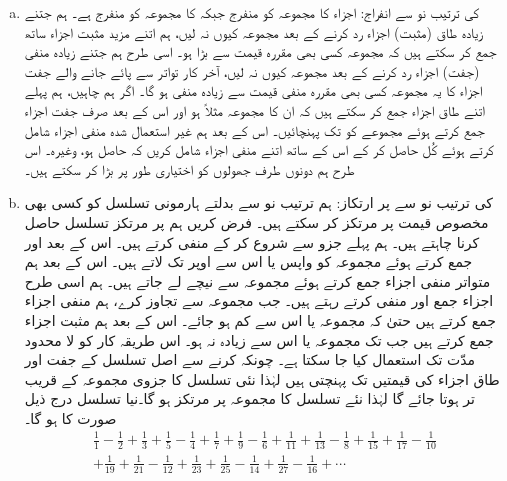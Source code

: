 \begin{enumerate}[a.]
\item
{} کی ترتیب نو سے انفراج: \quad
اجزاء  کا مجموعہ  کو منفرج جبکہ  کا مجموعہ  کو منفرج ہے۔ ہم جتنے زیادہ طاق (مثبت) اجزاء رد کرنے  کے بعد  مجموعہ کیوں نہ لیں، ہم اتنے  مزید مثبت اجزاء  ساتھ جمع کر سکتے ہیں کہ   مجموعہ کسی بھی مقررہ قیمت سے بڑا ہو۔ اسی طرح ہم  جتنے زیادہ منفی (جفت)  اجزاء  رد کرنے کے بعد  مجموعہ کیوں نہ لیں، آخر کار تواتر سے پائے جانے والے جفت اجزاء کا یہ مجموعہ کسی بھی مقررہ منفی قیمت سے زیادہ منفی ہو گا۔ اگر ہم چاہیں، ہم پہلے اتنے طاق اجزاء جمع کر سکتے ہیں کہ ان کا مجموعہ مثلاً  ہو اور اس کے بعد صرف جفت اجزاء جمع کرتے ہوئے مجموعے کو  تک پہنچائیں۔ اس کے بعد ہم غیر استعمال شدہ منفی اجزاء شامل کرتے ہوئے کُل حاصل کر کے اس کے ساتھ اتنے منفی اجزاء شامل کریں کہ  حاصل ہو، وغیرہ۔ اس طرح ہم دونوں طرف  جھولوں کو اختیاری  طور پر  بڑا کر سکتے ہیں۔ 
\item
{} کی ترتیب نو  سے  پر ارتکاز:\quad
ہم ترتیب نو سے   بدلتے ہارمونی تسلسل کو کسی بھی مخصوص قیمت پر مرتکز کر سکتے ہیں۔ فرض کریں ہم  پر مرتکز تسلسل حاصل کرنا چاہتے ہیں۔ ہم پہلے جزو  سے شروع کر کے  منفی کرتے ہیں۔ اس کے بعد  اور  جمع کرتے ہوئے مجموعہ کو واپس  یا اس سے اوپر تک لاتے ہیں۔ اس کے بعد ہم متواتر منفی اجزاء جمع کرتے ہوئے مجموعہ  سے نیچے لے جاتے ہیں۔ ہم اسی طرح اجزاء جمع اور منفی  کرتے رہتے  ہیں۔ جب مجموعہ  سے تجاوز کرے، ہم منفی اجزاء جمع کرتے ہیں حتیٰ  کہ مجموعہ  یا اس سے کم ہو جائے۔ اس کے بعد ہم مثبت اجزاء جمع کرتے ہیں جب تک مجموعہ   یا اس سے زیادہ نہ ہو۔ اس طریقہ کار کو لا محدود     مدّت  تک  استعمال کیا جا سکتا ہے۔ چونکہ  کرنے سے اصل تسلسل کے جفت اور طاق اجزاء کی قیمتیں  تک پہنچتی ہیں لہٰذا  نئی تسلسل کا جزوی مجموعہ   کے قریب تر ہوتا جائے گا لہٰذا نئے تسلسل کا مجموعہ  پر مرتکز ہو گا۔نیا تسلسل درج ذیل صورت کا ہو گا۔
\begin{multline*}
\frac{1}{1}-\frac{1}{2}+\frac{1}{3}+\frac{1}{5}-\frac{1}{4}+\frac{1}{7}+\frac{1}{9}-\frac{1}{6}+\frac{1}{11}+\frac{1}{13}-\frac{1}{8}+\frac{1}{15}+\frac{1}{17}-\frac{1}{10}\\+\frac{1}{19}+\frac{1}{21}-\frac{1}{12}+\frac{1}{23}+\frac{1}{25}-\frac{1}{14}+\frac{1}{27}-\frac{1}{16}+\cdots
\end{multline*}
\end{enumerate}

